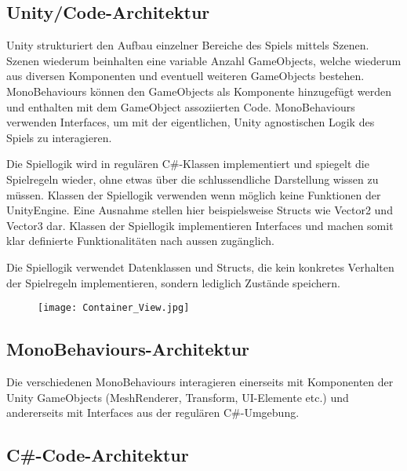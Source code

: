 \documentclass[../main.tex]{subfiles}
\begin{document}
	\subsection{Unity/Code-Architektur}
	\par Unity strukturiert den Aufbau einzelner Bereiche des Spiels mittels Szenen. Szenen wiederum beinhalten eine variable Anzahl GameObjects, welche wiederum aus diversen Komponenten und eventuell weiteren GameObjects bestehen. MonoBehaviours können den GameObjects als Komponente hinzugefügt werden und enthalten mit dem GameObject assoziierten Code. MonoBehaviours verwenden Interfaces, um mit der eigentlichen, Unity agnostischen Logik des Spiels zu interagieren.
	\par Die Spiellogik wird in regulären C\#-Klassen implementiert und spiegelt die Spielregeln wieder, ohne etwas über die schlussendliche Darstellung wissen zu müssen. Klassen der Spiellogik verwenden wenn möglich keine Funktionen der UnityEngine. Eine Ausnahme stellen hier beispielsweise Structs wie Vector2 und Vector3 dar. Klassen der Spiellogik implementieren Interfaces und machen somit klar definierte Funktionalitäten nach aussen zugänglich.
	\par Die Spiellogik verwendet Datenklassen und Structs, die kein konkretes Verhalten der Spielregeln implementieren, sondern lediglich Zustände speichern.
	\begin{figure}[H]
		\centering
		\texttt{[image: Container\_View.jpg]}
	\end{figure}
	
	\subsection{MonoBehaviours-Architektur}
	\par Die verschiedenen MonoBehaviours interagieren einerseits mit Komponenten der Unity GameObjects (MeshRenderer, Transform, UI-Elemente etc.) und andererseits mit Interfaces aus der regulären C\#-Umgebung.
	\subsection{C\#-Code-Architektur}
\end{document}
